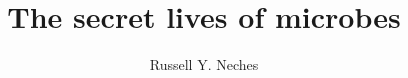 \documentclass[PhD]{ucdavisthesis}
\title{The secret lives of microbes}
\author{Russell Y. Neches}
\begin{document}
\makeintropages

%
%

%
%

\end{document}
